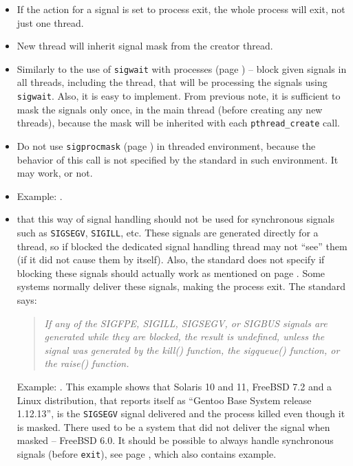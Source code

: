 \begin{itemize}
\item If the action for a signal is set to process exit, the whole process
will exit, not just one thread.
\item New thread will inherit signal mask from the creator thread.
\item Similarly to the use of \texttt{sigwait} with processes (page
\pageref{SIGWAIT}) -- block given signals in all threads, including the
thread, that will be processing the signals using \texttt{sigwait}.
 Also, it is easy to implement. From previous note, it is sufficient
to mask the signals only once, in the main thread (before creating any new
threads), because the mask will be inherited with each \texttt{pthread\_create}
call.
\item Do not use \texttt{sigprocmask} (page \pageref{SIGPROCMASK}) in threaded
environment, because the behavior of this call is not specified by the standard
in such environment. It may work, or not.
\item \label{THREADS_SIGWAIT} Example: .
\item {} that this way of signal handling should not be used for
synchronous signals such as \texttt{SIGSEGV}, \texttt{SIGILL}, etc. These
signals are generated directly for a thread, so if blocked the dedicated signal
handling thread may not ``see'' them (if it did not cause them by itself).
Also, the standard does not specify if blocking these signals should actually
work as mentioned on page \pageref{SPECIALSIGNALS}. Some systems
normally deliver these signals, making the process exit. The standard says:

\begin{quote}
\emph{If any of the SIGFPE, SIGILL, SIGSEGV, or SIGBUS signals are generated
while they are blocked, the result is undefined, unless the signal was generated
by the kill() function, the sigqueue() function, or the raise() function.}
\end{quote}

Example: . This example shows that
Solaris 10 and 11, FreeBSD 7.2 and a Linux distribution, that reports
itself as ``Gentoo Base System release 1.12.13'', is the \texttt{SIGSEGV} signal
delivered and the process killed even though it is masked.
There used to be a system that did not deliver the signal when masked
-- FreeBSD 6.0. It should be possible to always handle synchronous signals
(before \texttt{exit}), see page \pageref{SPECIALSIGNALS}, which also
contains example.

\end{itemize}


